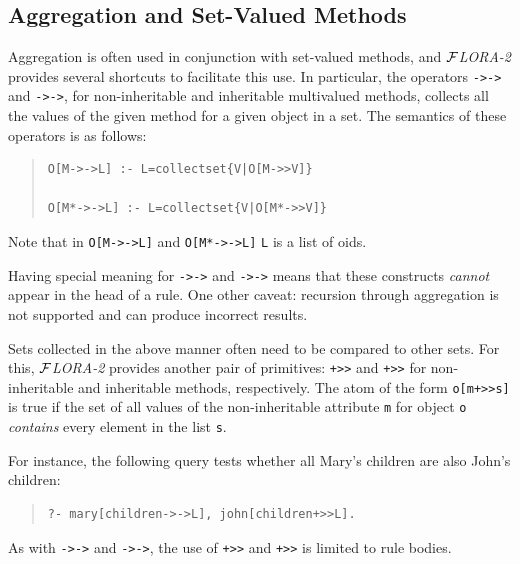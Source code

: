 \documentclass[11pt]{article}
\newcommand{\FLORA}{{\mbox{${\cal F}${\small\it LORA}\rm\emph{-2}}}\xspace}
\begin{document}
\subsection {Aggregation and Set-Valued Methods}

\index{->->}
\index{*->->}
Aggregation is often used in conjunction with set-valued methods, and
\FLORA provides several shortcuts to facilitate this use.
In particular, the operators
{\tt ->->} and {\tt *->->}, for non-inheritable and
inheritable multivalued methods, collects all the values of the given
method for a given object in a set. The semantics of these operators is
as follows:

\begin{quote}
\begin{verbatim}
O[M->->L] :- L=collectset{V|O[M->>V]}

O[M*->->L] :- L=collectset{V|O[M*->>V]}
\end{verbatim}
\end{quote}

\noindent
Note that in {\tt O[M->->L]}  and {\tt O[M*->->L]}  {\tt L} is a list of oids.

Having special meaning for {\tt ->->} and {\tt *->->} means that these
constructs \emph{cannot} appear in the head of a rule.
One other caveat: recursion through aggregation is not supported and can
produce incorrect results.



\index{\tt +>>}
\index{\tt *+>>}
Sets collected in the above manner often  need to be compared to other
sets. For this, \FLORA provides another pair of primitives: {\tt +>>} and
{\tt *+>>} for non-inheritable and inheritable methods, respectively.
The atom of the form {\tt o[m+>>s]} is true if the set of all values of the
non-inheritable attribute {\tt m} for object {\tt o} \emph{contains} every
element in the list {\tt s}. 

For instance, the following query tests whether all Mary's children are
also John's children:
\begin{quote}
\begin{verbatim}
?- mary[children->->L], john[children+>>L].
\end{verbatim}
\end{quote}

As with {\tt ->->} and {\tt *->->},
the use of {\tt +>>} and {\tt *+>>} is limited to rule bodies.
\end{document}
